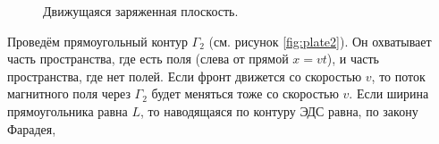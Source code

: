 \documentclass[12pt,a4paper]{article}
\numberwithin{equation}{section}
\numberwithin{equation}{section}
\begin{document}
\begin{figure}[h]
  \centering
  \hspace{2cm}
  \caption{Движущаяся заряженная плоскость.}
  \label{fig:moving_plate}
\end{figure}

Проведём прямоугольный контур $\Gamma_2$ (см. рисунок \ref{fig:plate2}). Он
охватывает часть пространства, где есть поля (слева от прямой $x=vt$),
и часть пространства, где нет полей. Если фронт движется со скоростью
$v$, то поток магнитного поля через $\Gamma_2$ будет меняться тоже со
скоростью $v$. Если ширина прямоугольника равна $L$, то наводящаяся по
контуру ЭДС равна, по закону Фарадея,
\end{document}

